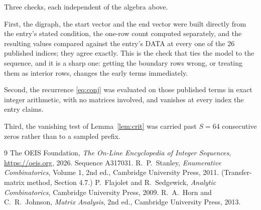 \documentclass[11pt,a4paper]{article}
\theoremstyle{plain}
\theoremstyle{definition}
\begin{document}
Three checks, each independent of the algebra above.

First, the digraph, the start vector and the end vector were built directly from the
entry's stated condition, the one-row count computed separately, and the resulting values
compared against the entry's DATA at every one of the $26$ published indices; they
agree exactly. This is the check that ties the model to the sequence, and it is a sharp one:
getting the boundary rows wrong, or treating them as interior rows, changes the early terms
immediately.

Second, the recurrence \eqref{eq:conj} was evaluated on those published terms in exact
integer arithmetic, with no matrices involved, and vanishes at every index the entry claims.

Third, the vanishing test of Lemma~\ref{lem:crit} was carried past $S=64$ consecutive
zeros rather than to a sampled prefix.

\begin{thebibliography}{9}
 The OEIS Foundation, \emph{The On-Line Encyclopedia of Integer
Sequences}, \url{https://oeis.org}, 2026. Sequence A317031.
 R.~P.~Stanley, \emph{Enumerative Combinatorics}, Volume 1, 2nd ed.,
Cambridge University Press, 2011. (Transfer-matrix method, Section 4.7.)
 P.~Flajolet and R.~Sedgewick, \emph{Analytic Combinatorics}, Cambridge
University Press, 2009.
 R.~A.~Horn and C.~R.~Johnson, \emph{Matrix Analysis}, 2nd ed., Cambridge
University Press, 2013.
\end{thebibliography}
\end{document}
